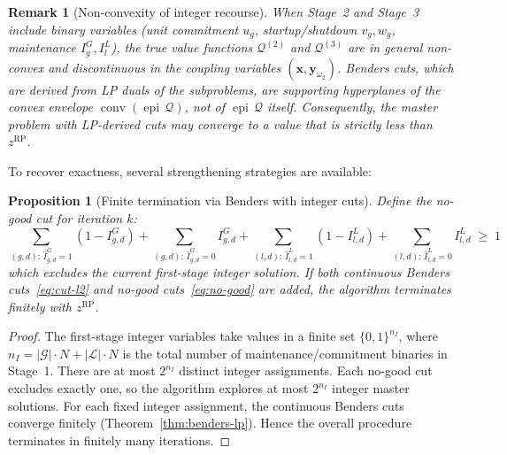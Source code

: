 \documentclass[11pt]{article}
\DeclareMathOperator{\conv}{conv}
\DeclareMathOperator{\epi}{epi}
\newtheorem{proposition}{Proposition}
\newtheorem{remark}{Remark}
\begin{document}
\begin{remark}[Non-convexity of integer recourse]
\label{rem:int-nonconvex}
When Stage~2 and Stage~3 include binary variables (unit commitment
$u_g$, startup/shutdown $v_g, w_g$, maintenance $I^G_g, I^L_l$), the
true value functions $\mathcal{Q}^{(2)}$ and $\mathcal{Q}^{(3)}$ are
in general \emph{non-convex} and \emph{discontinuous} in the coupling
variables $(\mathbf{x}, \mathbf{y}_{\omega_2})$. Benders cuts, which
are derived from LP duals of the subproblems, are supporting
hyperplanes of the \emph{convex envelope}
$\conv(\epi\,\mathcal{Q})$, not of $\epi\,\mathcal{Q}$ itself.
Consequently, the master problem with LP-derived cuts may converge to
a value that is strictly less than $z^{\mathrm{RP}}$.
\end{remark}

To recover exactness, several strengthening strategies are available:

\begin{proposition}[Finite termination via Benders with integer cuts]
\label{prop:int-benders}
Define the \emph{no-good cut} for iteration $k$:
\begin{equation}\label{eq:no-good}
  \sum_{(g,d):\, \hat{I}^G_{g,d}=1} (1 - I^G_{g,d})
  + \sum_{(g,d):\, \hat{I}^G_{g,d}=0} I^G_{g,d}
  + \sum_{(l,d):\, \hat{I}^L_{l,d}=1} (1 - I^L_{l,d})
  + \sum_{(l,d):\, \hat{I}^L_{l,d}=0} I^L_{l,d}
  \;\geq\; 1
\end{equation}
which excludes the current first-stage integer solution. If \emph{both}
continuous Benders cuts~\eqref{eq:cut-l2} and no-good
cuts~\eqref{eq:no-good} are added, the algorithm terminates finitely
with $z^{\mathrm{RP}}$.
\end{proposition}

\begin{proof}
The first-stage integer variables take values in a finite set
$\{0,1\}^{n_I}$, where $n_I = |\mathcal{G}| \cdot N +
|\mathcal{L}| \cdot N$ is the total number of maintenance/commitment
binaries in Stage~1. There are at most $2^{n_I}$ distinct integer
assignments. Each no-good cut excludes exactly one, so the algorithm
explores at most $2^{n_I}$ integer master solutions. For each fixed
integer assignment, the continuous Benders cuts converge finitely
(Theorem~\ref{thm:benders-lp}). Hence the overall procedure terminates
in finitely many iterations.
\end{proof}
\end{document}
